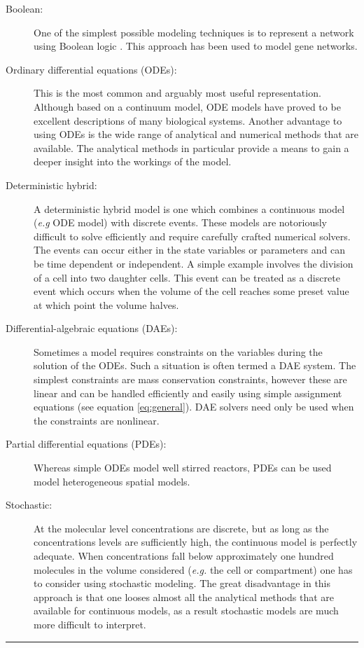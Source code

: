 \begin{description}
\item[Boolean:]
One of the simplest possible modeling techniques is to represent a
network using Boolean logic \autocite{DeJong2002}. This approach has
been used to model gene networks.

\item[Ordinary differential equations (ODEs):]
This is the most common and arguably most useful representation.
Although based on a continuum model, ODE models have proved to be
excellent descriptions of many biological systems. Another advantage to
using ODEs is the wide range of analytical and numerical methods that
are available. The analytical methods in particular provide a means to
gain a deeper insight into the workings of the model.

\item[Deterministic hybrid:]
A deterministic hybrid model is one which combines a continuous model
(\emph{e.g} ODE model) with discrete events. These models are
notoriously difficult to solve efficiently and require carefully crafted
numerical solvers. The events can occur either in the state variables or
parameters and can be time dependent or independent. A simple example
involves the division of a cell into two daughter cells. This event can
be treated as a discrete event which occurs when the volume of the cell
reaches some preset value at which point the volume halves.

\item[Differential-algebraic equations (DAEs):]
Sometimes a model requires constraints on the variables during the
solution of the ODEs. Such a situation is often termed a DAE system. The
simplest constraints are mass conservation constraints, however these
are linear and can be handled efficiently and easily using simple
assignment equations (see equation \ref{eq:general}). DAE solvers need
only be used when the constraints are nonlinear.

\item[Partial differential equations (PDEs):]
Whereas simple ODEs model well stirred reactors, PDEs can be used model
heterogeneous spatial models.

\item[Stochastic:]
At the molecular level concentrations are discrete, but as long as the
concentrations levels are sufficiently high, the continuous model is
perfectly adequate. When concentrations fall below approximately one
hundred molecules in the volume considered (\emph{e.g.} the cell or
compartment) one has to consider using stochastic modeling. The great
disadvantage in this approach is that one looses almost all the
analytical methods that are available for continuous models, as a result
stochastic models are much more difficult to interpret.

\end{description}
\begin{center}\rule{3in}{0.4pt}\end{center}

